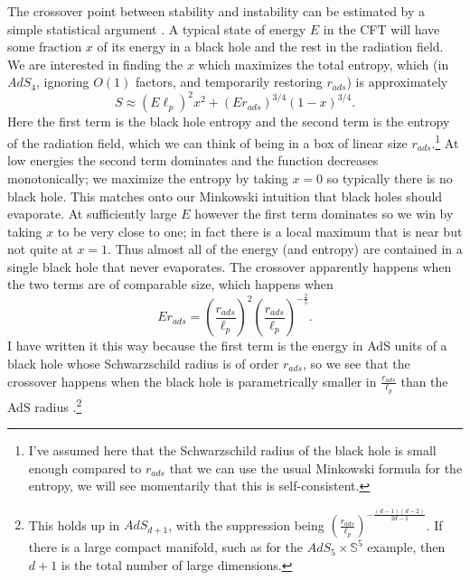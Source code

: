 \documentclass[12pt]{article}
\newcommand{\be}{\begin{equation}}
\newcommand{\ee}{\end{equation}}
\begin{document}
The crossover point between stability and instability can be estimated by a simple statistical argument \cite{Horowitz:1999uv}.  A typical state of energy $E$ in the CFT will have some fraction $x$ of its energy in a black hole and the rest in the radiation field.  We are interested in finding the $x$ which maximizes the total entropy, which (in $AdS_4$, ignoring $O(1)$ factors, and temporarily restoring $r_{\mathit{ads}}$) is approximately
\be
S\approx(E \ell_p)^2 x^2+(E r_{\mathit{ads}})^{3/4}(1-x)^{3/4}.
\ee
Here the first term is the black hole entropy and the second term is the entropy of the radiation field, which we can think of being in a box of linear size $r_{\mathit{ads}}$.\footnote{I've assumed here that the Schwarzschild radius of the black hole is small enough compared to $r_{\mathit{ads}}$ that we can use the usual Minkowski formula for the entropy, we will see momentarily that this is self-consistent.}  At low energies the second term dominates and the function decreases monotonically; we maximize the entropy by taking $x=0$ so typically there is no black hole.  This matches onto our Minkowski intuition that black holes should evaporate.  At sufficiently large $E$ however the first term dominates so we win by taking $x$ to be very close to one; in fact there is a local maximum that is near but not quite at $x=1$.  Thus almost all of the energy (and entropy) are contained in a single black hole that never evaporates.  The crossover apparently happens when the two terms are of comparable size, which happens when
\be\label{MCcross}
Er_{\mathit{ads}}=\left(\frac{r_{\mathit{ads}}}{\ell_p}\right)^2\left(\frac{r_{\mathit{ads}}}{\ell_p}\right)^{-\frac{2}{5}}.
\ee
I have written it this way because the first term is the energy in AdS units of a black hole whose Schwarzschild radius is of order $r_{\mathit{ads}}$, so we see that the crossover happens when the black hole is parametrically smaller in $\frac{r_{\mathit{ads}}}{\ell_p}$ than the AdS radius \cite{Horowitz:1999uv}.\footnote{This holds up in $AdS_{d+1}$, with the suppression being $\left(\frac{r_{\mathit{ads}}}{\ell_p}\right)^{-\frac{(d-1)(d-2)}{2d-1}}$.  If there is a large compact manifold, such as for the $AdS_5\times \mathbb{S}^5$ example, then $d+1$ is the total number of large dimensions.}  
\end{document}

